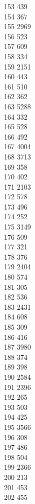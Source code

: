 { 153	439 \\
 154	367 \\
 155	2969 \\
 156	523 \\
 157	609 \\
 158	334 \\
 159	2151 \\
 160	443 \\
 161	510 \\
 162	362 \\
 163	5288 \\
 164	332 \\
 165	528 \\
 166	492 \\
 167	4004 \\
 168	3713 \\
 169	358 \\
 170	402 \\
 171	2103 \\
 172	578 \\
 173	496 \\
 174	252 \\
 175	3149 \\
 176	509 \\
 177	321 \\
 178	376 \\
 179	2404 \\
 180	574 \\
 181	305 \\
 182	536 \\
 183	2431 \\
 184	608 \\
 185	309 \\
 186	416 \\
 187	3980 \\
 188	374 \\
 189	398 \\
 190	2584 \\
 191	2396 \\
 192	265 \\
 193	503 \\
 194	425 \\
 195	3566 \\
 196	308 \\
 197	486 \\
 198	504 \\
 199	2366 \\
 200	213 \\
 201	453 \\
 202	455 \\
}
